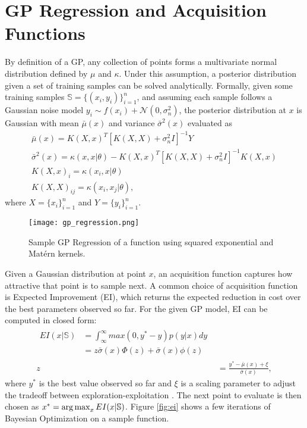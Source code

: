 \section{GP Regression and Acquisition Functions}
\label{gp_acq}
By definition of a GP, any collection of points forms a multivariate normal distribution defined by $\mu$ and $\kappa$. Under this assumption, a posterior distribution given a set of training samples can be solved analytically. Formally, given some training samples $\mathbb{S} = \{(x_i, y_i)\}_{i=1}^n$, and assuming each sample follows a Gaussian noise model $y_i \sim f(x_i) + \mathcal{N}(0, \sigma_n^2)$, the posterior distribution at $x$ is Gaussian with mean $\bar{\mu}(x)$ and variance $\bar{\sigma}^2(x)$ evaluated as
\begin{gather}
  \bar{\mu}(x) = K(X, x)^T[K(X, X) + \sigma_n^2 I]^{-1}Y \\
  \bar{\sigma}^2(x) = \kappa(x, x\vert \theta) - K(X, x)^T[K(X,X) + \sigma_n^2 I]^{-1}K(X,x) \\
  K(X,x)_i = \kappa(x_i, x\vert \theta) \nonumber\\
  K(X,X)_{ij} = \kappa(x_i, x_j\vert \theta) \nonumber,
\end{gather}
where $X = \{x_i\}_{i=1}^n$ and $Y = \{y_i\}_{i=1}^n$. 
\begin{figure}[t]
\centering
\texttt{[image: gp\_regression.png]}
\caption{Sample GP Regression of a function using squared exponential and Matérn kernels.}
\label{fig:gp_regression}
\end{figure}

Given a Gaussian distribution at point $x$, an acquisition function captures how attractive that point is to sample next. A common choice of acquisition function is Expected Improvement (EI), which returns the expected reduction in cost over the best parameters observed so far. For the given GP model, EI can be computed in closed form: 
\begin{align}
  \begin{split}
  EI(x\vert \mathbb{S}) &= \int_\infty^\infty max(0, y^*-y)p(y\vert x)dy\\
    &= z\bar{\sigma}(x)\Phi(z) + \bar{\sigma}(x)\phi(z)
  \end{split}\\
  z &= \frac{y^* - \bar{\mu}(x) + \xi}{\bar{\sigma}(x)}\nonumber,
\end{align}
where $y^*$ is the best value observed so far and $\xi$ is a scaling parameter to adjust the tradeoff between exploration-exploitation \citep{Lizotte:2008:PBO:1626686}. The next point to evaluate is then chosen as $x^* = \operatorname*{arg\,max}_{x} EI(x \vert \mathbb{S})$. Figure \ref{fig:ei} shows a few iterations of Bayesian Optimization on a sample function.

